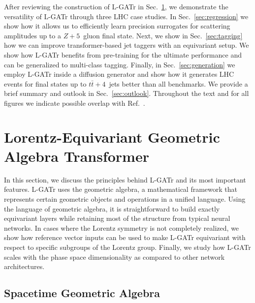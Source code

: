 \documentclass[submission, Phys]{SciPost}
\begin{document}
After reviewing the construction of L-GATr in Sec.~\ref{sec:lgatr}, we demonstrate the versatility of L-GATr through three LHC case studies. In Sec.~\ref{sec:regression} we show how it allows us to efficiently learn precision surrogates for scattering amplitudes up to a $Z+5$~gluon final state. Next, we show in Sec.~\ref{sec:tagging} how we can improve transformer-based jet taggers with an equivariant setup. We show how L-GATr benefits from pre-training for the ultimate performance and can be generalized to multi-class tagging. Finally, in Sec.~\ref{sec:generation} we employ L-GATr inside a diffusion generator and show how it generates LHC events for final states up to $t\bar{t}+4$~jets better than all benchmarks. 
%
We provide a brief summary and outlook in Sec.~\ref{sec:outlook}.
%
Throughout the text and for all figures we indicate possible overlap with Ref.~\cite{Spinner:2024hjm}.

\section{Lorentz-Equivariant Geometric Algebra Transformer}
\label{sec:lgatr}

In this section, we discuss the principles behind L-GATr and its most important features. L-GATr uses the geometric algebra, a mathematical framework that represents certain geometric objects and operations in a unified language. Using the language of geometric algebra, it is straightforward to build exactly equivariant layers while retaining most of the structure from typical neural networks. In cases where the Lorentz symmetry is not completely realized, we show how reference vector inputs can be used to make L-GATr equivariant with respect to specific subgroups of the Lorentz group. Finally, we study how L-GATr scales with the phase space dimensionality as compared to other network architectures.

\subsection{Spacetime Geometric Algebra}
\label{sec:algebra}
\end{document}
